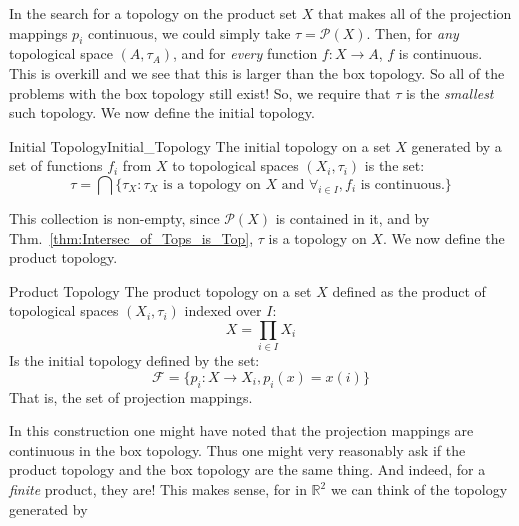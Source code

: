     \par\hfill\par
    In the search for a topology on the product set $X$ that makes
    all of the projection mappings $p_{i}$ continuous, we could
    simply take $\tau=\mathcal{P}(X)$. Then, for \textit{any}
    topological space $(A,\tau_{A})$, and for \textit{every}
    function $f:X\rightarrow{A}$, $f$ is continuous.
    This is overkill and we see that this is larger than the
    box topology. So all of the problems with the box topology still
    exist! So, we require that $\tau$ is the \textit{smallest}
    such topology. We now define the initial topology.
    \begin{ldefinition}{Initial Topology}{Initial_Topology}
        The initial topology on a set $X$ generated by
        a set of functions $f_{i}$ from $X$ to topological
        spaces $(X_{i},\tau_{i})$ is the set:
        \begin{equation}
            \tau=\bigcap\big\{\tau_{X}:
                \tau_{X}\textrm{ is a topology on $X$ and }
                \forall_{i\in{I}},f_{i}
                \textrm{ is continuous.}\big\}
        \end{equation}
    \end{ldefinition}
    This collection is non-empty, since $\mathcal{P}(X)$ is contained
    in it, and by Thm.~\ref{thm:Intersec_of_Tops_is_Top},
    $\tau$ is a topology on $X$. We now define the product topology.
    \begin{ldefinition}{Product Topology}
        The product topology on a set $X$ defined as the
        product of topological spaces $(X_{i},\tau_{i})$
        indexed over $I$:
        \begin{equation}
            X=\prod_{i\in{I}}X_{i}
        \end{equation}
        Is the initial topology defined by the set:
        \begin{equation}
            \mathscr{F}=
            \{p_{i}:X\rightarrow{X}_{i},p_{i}(x)=x(i)\}
        \end{equation}
        That is, the set of projection mappings.
    \end{ldefinition}
    In this construction one might have noted that the
    projection mappings are continuous in the box topology.
    Thus one might very reasonably ask if the product topology
    and the box topology are the same thing. And indeed, for
    a \textit{finite} product, they are! This makes sense, for in
    $\mathbb{R}^{2}$ we can think of the topology generated by
